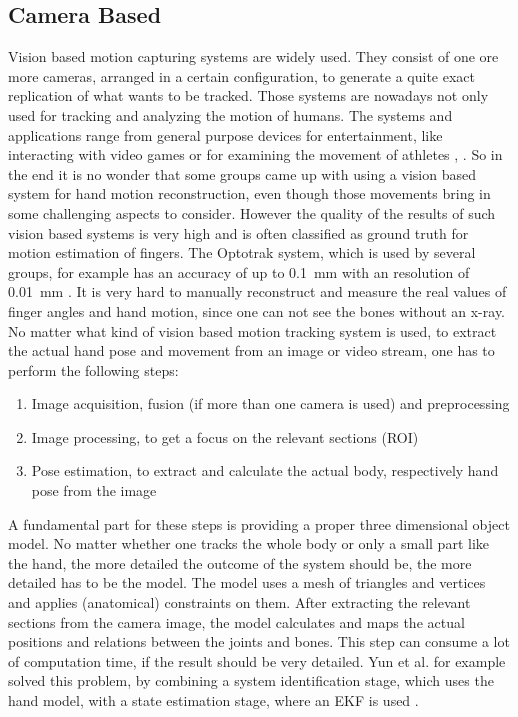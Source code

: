 \subsection{Camera Based} \label{subsec:approaches:vision}
Vision based motion capturing systems are widely used. They consist of one ore more cameras, arranged in a certain configuration, to generate a quite exact replication of what wants to be tracked. Those systems are nowadays not only used for tracking and analyzing the motion of humans. The systems and applications range from general purpose devices for entertainment, like interacting with video games or for examining the movement of athletes \cite{zhang2012microsoft}, \cite{boyd2012situ}. So in the end it is no wonder that some groups came up with using a vision based system for hand motion reconstruction, even though those movements bring in some challenging aspects to consider. However the quality of the results of such vision based systems is very high and is often classified as ground truth for motion estimation of fingers. The Optotrak system, which is used by several groups, for example has an accuracy of up to \SI{0.1}{\mm} with an resolution of \SI{0.01}{\mm} \cite{optotrak}. It is very hard to manually reconstruct and measure the real values of finger angles and hand motion, since one can not see the bones without an x-ray. \\
No matter what kind of vision based motion tracking system is used, to extract the actual hand pose and movement from an image or video stream, one has to perform the following steps:
\begin{enumerate}
\item Image acquisition, fusion (if more than one camera is used) and preprocessing
\item Image processing, to get a focus on the relevant sections (\ac{ROI}) 
\item Pose estimation, to extract and calculate the actual body, respectively hand pose from the image
\end{enumerate}
A fundamental part for these steps is providing a proper three dimensional object model. No matter whether one tracks the whole body or only a small part like the hand, the more detailed the outcome of the system should be, the more detailed has to be the model. The model uses a mesh of triangles and vertices and applies (anatomical) constraints on them. After extracting the relevant sections from the camera image, the model calculates and maps the actual positions and relations between the joints and bones. This step can consume a lot of computation time, if the result should be very detailed. Yun et al. for example solved this problem, by combining a system identification stage, which uses the hand model, with a state estimation stage, where an \ac{EKF} is used \cite{yun2013accurate}.

